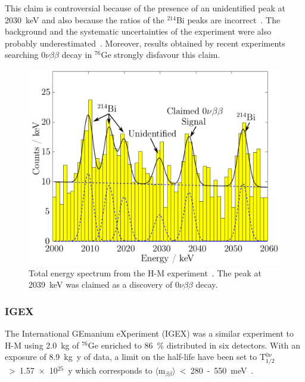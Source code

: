 \documentclass[main.tex]{subfiles}
\begin{document}
\bigskip


\NI This claim is controversial because of the presence of an unidentified peak at 2030~keV and also because the ratios of the $^{\text{214}}$Bi peaks are incorrect~\cite{HeidelbergMoscow3}. The background and the systematic uncertainties of the experiment were also probably underestimated~\cite{HeidelbergMoscow3}. Moreover, results obtained by recent experiments searching 0$\nu\beta\beta$ decay in $^{\text{76}}$Ge strongly disfavour this claim.



\begin{figure}[h!]
\begin{center}
\includegraphics[scale=0.3]{pictures/Chap2/H-M-experiment-claim.png}
\caption{Total energy spectrum from the H-M experiment~\cite{HeidelbergMoscow1}. The peak at 2039~keV was claimed as a discovery of 0$\nu\beta\beta$ decay.}
\label{HMexperimentClaim}
\end{center}
\end{figure}


\FloatBarrier

\subsubsection{IGEX}


\NI The International GEmanium eXperiment (IGEX) was a similar experiment to H-M using 2.0~kg of $^{\text{76}}$Ge enriched to 86~\% distributed in six detectors. With an exposure of 8.9~kg~y of data, a limit on the half-life have been set to T$_{\text{1/2}}^{0\nu}$~>~1.57~$\times$~10$^{\text{25}}$~y which corresponds to $\langle \text{m}_{\beta\beta} \rangle$~<~280~-~550~meV~\cite{IGEX}.
\end{document}

